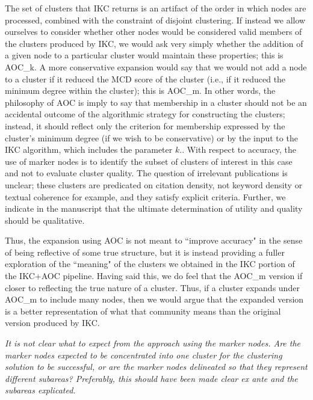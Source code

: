 \documentclass[11pt, oneside]{article}   	%
\begin{document}
{The set of clusters that IKC returns is an artifact of the order in which nodes are processed, combined with the constraint of disjoint clustering. If instead we allow ourselves to consider whether other nodes would be considered valid members of the clusters produced by IKC, we would ask very simply whether the addition of a given node to a particular cluster would maintain these properties; this is AOC\_k.  A more conservative expansion would say that we would not add a node to a cluster if it reduced the MCD score of the cluster (i.e., if it reduced the minimum degree within the cluster); this is AOC\_{m}.  In other words, the philosophy of AOC is imply to say that membership in a cluster should not be an accidental outcome of the algorithmic strategy for constructing the clusters; instead, it should reflect only the criterion for membership expressed by the cluster's minimum degree (if we wish to be conservative) or by the input to the IKC algorithm, which includes the parameter $k$.}. With respect to accuracy, the  use of marker nodes is to identify the subset of clusters of interest in this case and not to evaluate cluster quality. The question of irrelevant publications is unclear; these clusters are predicated on citation density, not keyword density or textual coherence for example, and they satisfy explicit criteria. Further, we indicate in the manuscript that the ultimate determination of utility and quality should be qualitative.

Thus, the expansion using AOC is not meant to ``improve accuracy" in the sense of being reflective of some true structure, but it is instead providing a fuller exploration of the ``meaning" of the clusters we obtained in the IKC portion of the IKC+AOC pipeline.  Having said this, we do feel that the AOC\_{m} version if closer to reflecting the true nature of a cluster. Thus, if a cluster expands under AOC\_{m}  to include many nodes, then we would argue that the expanded version  is a better representation of what that community means than the original version produced by IKC. 

\vspace{2 mm}  
\emph{It is not clear what to expect from the approach using the marker nodes. Are the marker nodes expected to be concentrated into one cluster for the clustering solution to be successful, or are the marker nodes delineated so that they represent different subareas? Preferably, this should have been made clear ex ante and the subareas explicated.}
\end{document}

